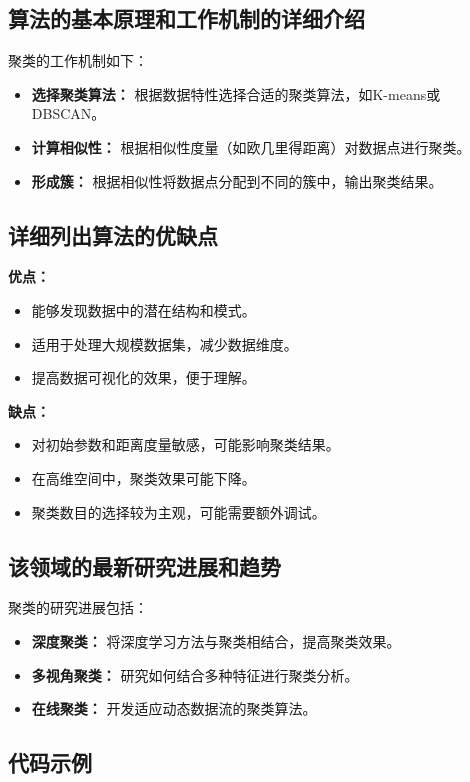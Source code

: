 \subsection*{算法的基本原理和工作机制的详细介绍}
聚类的工作机制如下：
\begin{itemize}
    \item \textbf{选择聚类算法：} 根据数据特性选择合适的聚类算法，如K-means或DBSCAN。
    \item \textbf{计算相似性：} 根据相似性度量（如欧几里得距离）对数据点进行聚类。
    \item \textbf{形成簇：} 根据相似性将数据点分配到不同的簇中，输出聚类结果。
\end{itemize}

\subsection*{详细列出算法的优缺点}
\textbf{优点：}
\begin{itemize}
    \item 能够发现数据中的潜在结构和模式。
    \item 适用于处理大规模数据集，减少数据维度。
    \item 提高数据可视化的效果，便于理解。
\end{itemize}

\textbf{缺点：}
\begin{itemize}
    \item 对初始参数和距离度量敏感，可能影响聚类结果。
    \item 在高维空间中，聚类效果可能下降。
    \item 聚类数目的选择较为主观，可能需要额外调试。
\end{itemize}

\subsection*{该领域的最新研究进展和趋势}
聚类的研究进展包括：
\begin{itemize}
    \item \textbf{深度聚类：} 将深度学习方法与聚类相结合，提高聚类效果。
    \item \textbf{多视角聚类：} 研究如何结合多种特征进行聚类分析。
    \item \textbf{在线聚类：} 开发适应动态数据流的聚类算法。
\end{itemize}
\subsection*{代码示例}
\begin{lstlisting}

\end{lstlisting}


